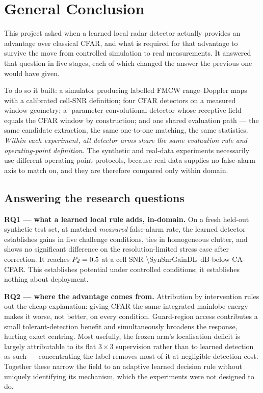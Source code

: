 \chapter*{General Conclusion}

This project asked when a learned local radar detector actually provides an advantage over classical
CFAR, and what is required for that advantage to survive the move from controlled simulation to real
measurements. It answered that question in five stages, each of which changed the answer the
previous one would have given.

To do so it built: a simulator producing labelled FMCW range--Doppler maps with a calibrated
cell-SNR definition; four CFAR detectors on a measured window geometry; a
\TinyParams{}-parameter convolutional detector whose receptive field equals the CFAR window by
construction; and one shared evaluation path --- the same candidate extraction, the same one-to-one
matching, the same statistics. \emph{Within each experiment, all detector arms share the same
evaluation rule and operating-point definition.} The synthetic and real-data experiments necessarily
use different operating-point protocols, because real data supplies no false-alarm axis to match on,
and they are therefore compared only within domain.

\section*{Answering the research questions}

\textbf{RQ1 --- what a learned local rule adds, in-domain.} On a fresh held-out synthetic test set,
at matched \emph{measured} false-alarm rate, the learned detector establishes gains in five challenge
conditions, ties in homogeneous clutter, and shows no significant difference on the
resolution-limited stress case after correction. It reaches $P_{d} = 0.5$ at a cell SNR
\SI{\SynSnrGainDL}{\deci\bel} below CA-CFAR. This establishes potential under controlled conditions;
it establishes nothing about deployment.

\textbf{RQ2 --- where the advantage comes from.} Attribution by intervention rules out the cheap
explanation: giving CFAR the same integrated mainlobe energy makes it worse, not better, on every
condition. Guard-region access contributes a small tolerant-detection benefit and simultaneously
broadens the response, hurting exact centring. Most usefully, the frozen arm's localisation deficit
is largely attributable to its flat $3\times3$ supervision rather than to learned detection as such
--- concentrating the label removes most of it at negligible detection cost. Together these narrow
the field to an adaptive learned decision rule without uniquely identifying its mechanism, which the
experiments were not designed to do.

